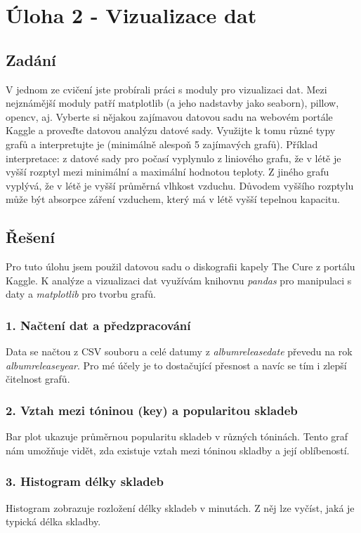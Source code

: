 \documentclass[a4paper,12pt]{article}
\begin{document}
	\section {Úloha 2 - Vizualizace dat}
	\subsection{Zadání}
V jednom ze cvičení jste probírali práci s moduly pro vizualizaci dat. Mezi nejznámější moduly patří matplotlib (a jeho nadstavby jako seaborn), pillow, opencv, aj. Vyberte si nějakou zajímavou datovou sadu na webovém portále Kaggle a proveďte datovou analýzu datové sady. Využijte k tomu různé typy grafů a interpretujte je (minimálně alespoň 5 zajímavých grafů). Příklad interpretace: z datové sady pro počasí vyplynulo z liniového grafu, že v létě je vyšší rozptyl mezi minimální a maximální hodnotou teploty. Z jiného grafu vyplývá, že v létě je vyšší průměrná vlhkost vzduchu. Důvodem vyššího rozptylu může být absorpce záření vzduchem, který má v létě vyšší tepelnou kapacitu.

\subsection{Řešení}
\justify
Pro tuto úlohu jsem použil datovou sadu o diskografii kapely The Cure z portálu Kaggle. K analýze a vizualizaci dat využívám knihovnu \textit{pandas} pro manipulaci s daty a \textit{matplotlib} pro tvorbu grafů.
\justify
\subsubsection{1. Načtení dat a předzpracování}
Data se načtou z CSV souboru a celé datumy z \textit{album{\textunderscore}release{\textunderscore}date} převedu na rok \textit{album{\textunderscore}release{\textunderscore}year}. Pro mé účely je to dostačující přesnost a navíc se tím i zlepší čitelnost grafů.
\subsubsection{2. Vztah mezi tóninou (key) a popularitou skladeb}
Bar plot ukazuje průměrnou popularitu skladeb v různých tóninách. Tento graf nám umožňuje vidět, zda existuje vztah mezi tóninou skladby a její oblíbeností.
\subsubsection{3. Histogram délky skladeb}
Histogram zobrazuje rozložení délky skladeb v minutách. Z něj lze vyčíst, jaká je typická délka skladby.
\end{document}
